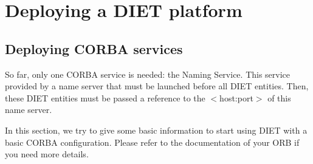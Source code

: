 
\chapter{Deploying a DIET platform}
\label{ch:deploying}


\section{Deploying CORBA services}
\label{sec:CORBA_services}

So far, only one CORBA service is needed: the Naming Service. This
service provided by a name server that must be launched before all
DIET entities. Then, these DIET entities must be passed a reference to
the $<$host:port$>$ of this name server.

In this section, we try to give some basic information to start using DIET with
a basic CORBA configuration. Please refer to the documentation of your ORB if
you need more details.

